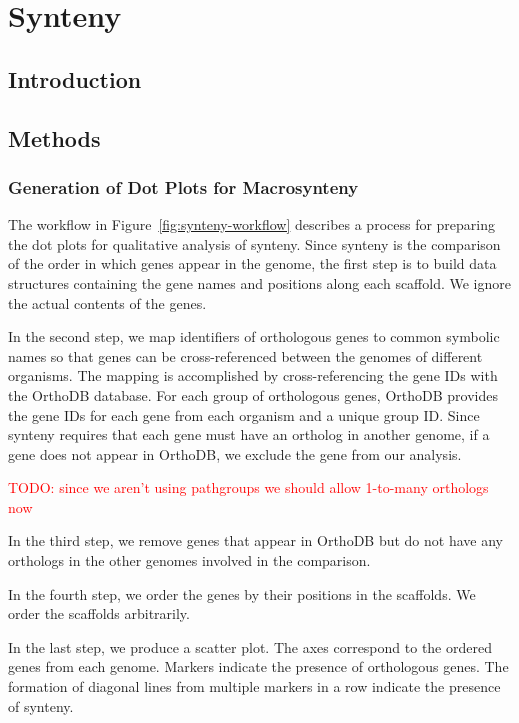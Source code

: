 \section{Synteny}

\subsection{Introduction}

\subsection{Methods}

\subsubsection{Generation of Dot Plots for Macrosynteny}

The workflow in Figure~\ref{fig:synteny-workflow} describes a process for preparing the dot plots for qualitative analysis of synteny.  Since synteny is the comparison of the order in which genes appear in the genome, the first step is to build data structures containing the gene names and positions along each scaffold.  We ignore the actual contents of the genes.

In the second step, we map identifiers of orthologous genes to common symbolic names so that genes can be cross-referenced between the genomes of different organisms. The mapping is accomplished by cross-referencing the gene IDs with the OrthoDB database.  
For each group of orthologous genes, OrthoDB provides the gene IDs for each gene from each organism and a unique group ID. Since synteny requires that each gene must have an ortholog in another genome, if a gene does not appear in OrthoDB, we exclude the gene from our analysis. 

\textcolor{red}{TODO: since we aren't using pathgroups we should allow 1-to-many orthologs now}

In the third step, we remove genes that appear in OrthoDB but do not have any orthologs in the other genomes involved in the comparison.

In the fourth step, we order the genes by their positions in the scaffolds.  We order the scaffolds arbitrarily.

In the last step, we produce a scatter plot.  The axes correspond to the ordered genes from each genome.  Markers indicate the presence of orthologous genes.  The formation of diagonal lines from multiple markers in a row indicate the presence of synteny.

